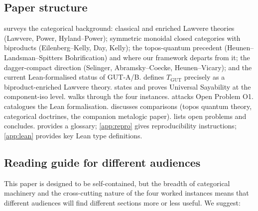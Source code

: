 \documentclass[11pt,a4paper]{article}
\theoremstyle{plain}
\theoremstyle{definition}
\theoremstyle{remark}
\newcommand{\TGUT}{T_{\mathrm{GUT}}}
\begin{document}
\subsection{Paper structure}\label{sec:intro:structure}

 surveys the categorical background: classical and enriched Lawvere theories (Lawvere, Power, Hyland--Power); symmetric monoidal closed categories with biproducts (Eilenberg--Kelly, Day, Kelly); the topos-quantum precedent (Heunen--Landsman--Spitters Bohrification) and where our framework departs from it; the dagger-compact direction (Selinger, Abramsky--Coecke, Heunen--Vicary); and the current Lean-formalised status of GUT-A/B.  defines $\TGUT$ precisely as a biproduct-enriched Lawvere theory.  states and proves Universal Sayability at the component-iso level.  walks through the four instances.  attacks Open Problem O1.  catalogues the Lean formalisation.  discusses comparisons (topos quantum theory, categorical doctrines, the companion metalogic paper).  lists open problems and concludes.  provides a glossary; \cref{app:repro} gives reproducibility instructions; \cref{app:lean} provides key Lean type definitions.

\subsection{Reading guide for different audiences}\label{sec:intro:reading}

This paper is designed to be self-contained, but the breadth of categorical machinery and the cross-cutting nature of the four worked instances means that different audiences will find different sections more or less useful. We suggest:
\end{document}
